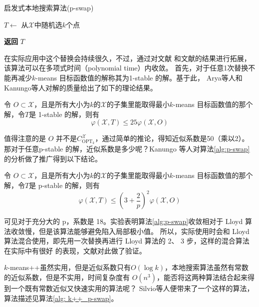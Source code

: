 \begin{algorithm}[H]
    \caption{启发式本地搜索算法(p-swap)}\label{alg:p-swap}
    $T \gets $ 从$\mathcal{X}$中随机选$k$个点 \\
    
    \textbf{返回} $T$
\end{algorithm}
在实际应用中这个替换会持续很久，不过，通过对文献
\cite{arya2004local}和文献\cite{charikar1999improved}的结果进行拓展，该算法可以在多项式时间（polynomial time）内收敛。 首先，对于任意1次替换不能再减少$k$-means 目标函数值的解称其为1-stable 的解。基于此， Arya等人和Kanungo等人对解的质量给出了如下的理论结果。
\begin{theorem}[1-stable的解的质量]
    令 $O \subset \mathcal{X}$，且是所有大小为$k$的$\mathcal{X}$的子集里能取得最小$k$-means 目标函数值的那个解，令$T$是 1-stable 的解，则有
    \begin{equation*}
        \varphi(\mathcal{X},T) \leq 25 \varphi(\mathcal{X},O)
    \end{equation*}
\end{theorem}
值得注意的是 $O$ 并不是$C_{\text{OPT}_k}^{\mathcal{X}}$，通过简单的推论，得知近似系数是50（乘以2）。那对于任意p-stable 的解，近似系数是多少呢？Kanungo 等人对算法\ref{alg:p-swap}的分析做了推广得到以下结论。
\begin{theorem}[p-stable的解的质量]
    令 $O \subset \mathcal{X}$，且是所有大小为$k$的$\mathcal{X}$的子集里能取得最小$k$-means 目标函数值的那个解，令$T$是 p-stable 的解，则有
    \begin{equation*}
        \varphi(\mathcal{X},T) \leq (3+\frac{2}{p})^2 \varphi(\mathcal{X},O)
    \end{equation*}
\end{theorem}
可见对于充分大的 p，系数是 18。实验表明算法\ref{alg:p-swap}收敛相对于 Lloyd 算法收敛慢，但是该算法能够避免陷入局部极小值。
所以，实际使用时会和 Lloyd 算法混合使用，即先用一次替换再进行 Lloyd 算法的 2、 3 步，这样的混合算法在实际中有很好
的表现，文献\cite{kanungo2004local}对此做了验证。

$k$-means++虽然实用，但是近似系数只有$O(\log k)$，本地搜索算法虽然有常数的近似系数，但是不实用，时间复杂度有
$O(n^3)$，能否将这两种算法结合起来得到一个既有常数近似又快速实用的算法呢？ Silvio等人便带来了一个这样的算法，算法描述见算法\ref{alg: k++_p-swap}。

